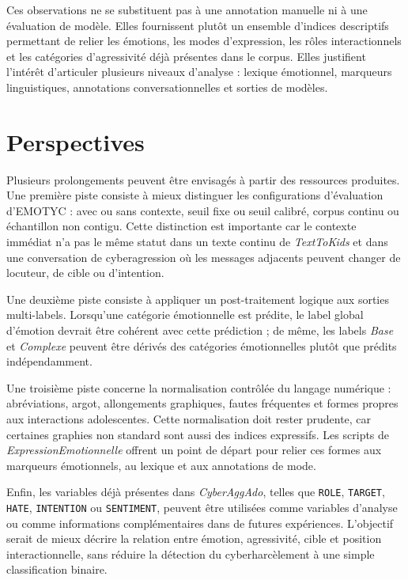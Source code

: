 Ces observations ne se substituent pas à une annotation manuelle ni à une évaluation de modèle. Elles fournissent plutôt un ensemble d'indices descriptifs permettant de relier les émotions, les modes d'expression, les rôles interactionnels et les catégories d'agressivité déjà présentes dans le corpus. Elles justifient l'intérêt d'articuler plusieurs niveaux d'analyse : lexique émotionnel, marqueurs linguistiques, annotations conversationnelles et sorties de modèles.


\section*{Perspectives}

Plusieurs prolongements peuvent être envisagés à partir des ressources produites. Une première piste consiste à mieux distinguer les configurations d'évaluation d'EMOTYC : avec ou sans contexte, seuil fixe ou seuil calibré, corpus continu ou échantillon non contigu. Cette distinction est importante car le contexte immédiat n'a pas le même statut dans un texte continu de \textit{TextToKids} et dans une conversation de cyberagression où les messages adjacents peuvent changer de locuteur, de cible ou d'intention.

Une deuxième piste consiste à appliquer un post-traitement logique aux sorties multi-labels. Lorsqu'une catégorie émotionnelle est prédite, le label global d'émotion devrait être cohérent avec cette prédiction ; de même, les labels \textit{Base} et \textit{Complexe} peuvent être dérivés des catégories émotionnelles plutôt que prédits indépendamment.

Une troisième piste concerne la normalisation contrôlée du langage numérique : abréviations, argot, allongements graphiques, fautes fréquentes et formes propres aux interactions adolescentes. Cette normalisation doit rester prudente, car certaines graphies non standard sont aussi des indices expressifs. Les scripts de \textit{ExpressionEmotionnelle} offrent un point de départ pour relier ces formes aux marqueurs émotionnels, au lexique et aux annotations de mode.

Enfin, les variables déjà présentes dans \textit{CyberAggAdo}, telles que \texttt{ROLE}, \texttt{TARGET}, \texttt{HATE}, \texttt{INTENTION} ou \texttt{SENTIMENT}, peuvent être utilisées comme variables d'analyse ou comme informations complémentaires dans de futures expériences. L'objectif serait de mieux décrire la relation entre émotion, agressivité, cible et position interactionnelle, sans réduire la détection du cyberharcèlement à une simple classification binaire.





